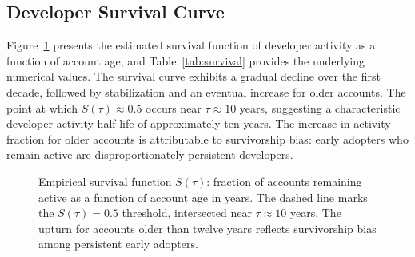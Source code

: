 \documentclass[12pt,a4paper]{article}
\begin{document}
\subsection{Developer Survival Curve}

Figure~\ref{fig:survival} presents the estimated survival function of developer activity as a function of account age, and Table~\ref{tab:survival} provides the underlying numerical values. The survival curve exhibits a gradual decline over the first decade, followed by stabilization and an eventual increase for older accounts. The point at which $S(\tau) \approx 0.5$ occurs near $\tau \approx 10$ years, suggesting a characteristic developer activity half-life of approximately ten years. The increase in activity fraction for older accounts is attributable to survivorship bias: early adopters who remain active are disproportionately persistent developers.

\begin{figure}[h]
\centering
{}
\caption{Empirical survival function $S(\tau)$: fraction of accounts remaining active as a function of account age in years. The dashed line marks the $S(\tau) = 0.5$ threshold, intersected near $\tau \approx 10$ years. The upturn for accounts older than twelve years reflects survivorship bias among persistent early adopters.}
\label{fig:survival}
\end{figure}
\end{document}
